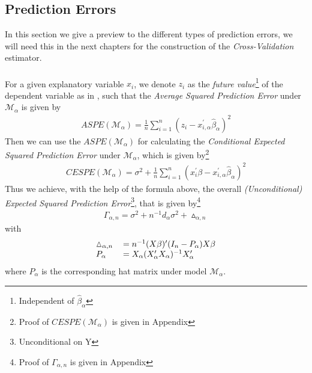 \documentclass[Research_Module_ES.tex]{subfiles}
\begin{document}
\subsection{Prediction Errors}
In this section we give a preview to the different types of prediction errors, we will need this in the next chapters for the construction of the \textit{Cross-Validation} estimator.\\\\
For a given explanatory variable $x_i$, we denote $z_i$ as the \textit{future value}\footnote{Independent of $\hat{\beta}_\alpha$} of the dependent variable as in \cite{shao}, such that the \textit{Average Squared Prediction Error} under $\mathcal{M}_\alpha$ is given by
\begin{align}
ASPE(\mathcal{M}_\alpha)=\frac{1}{n}\sum_{i=1}^{n}(z_i-x_{i,\alpha}^\prime\hat{\beta}_\alpha)^2 \label{ASPE}
\end{align}
Then we can use the $ASPE(\mathcal{M}_\alpha)$ for calculating the \textit{Conditional Expected Squared Prediction Error} under $\mathcal{M}_\alpha$, which is given by\footnote{Proof of $CESPE(\mathcal{M}_\alpha)$ is given in Appendix }
\begin{align*}
CESPE(\mathcal{M}_\alpha)=\sigma^2+\frac{1}{n}\sum_{i=1}^{n}(x_i^\prime\beta-x_{i,\alpha}^\prime\hat{\beta}_\alpha)^2
\end{align*}
Thus we achieve, with the help of the formula above, the overall \textit{(Unconditional) Expected Squared Prediction Error}\footnote{Unconditional on Y}, that is given by\footnote{Proof of $\Gamma_{\alpha,n}$ is given in Appendix } 
\begin{align}
\Gamma_{\alpha,n}=\sigma^2+n^{-1}d_\alpha\sigma^2+\vartriangle_{\alpha,n} 
\end{align}
with
\begin{align*}
\begin{tabular}{ll}
$\vartriangle_{\alpha,n}$&$=n^{-1}(X\beta)^\prime(I_n-P_\alpha)X\beta$\\
$P_\alpha$&$=X_\alpha(X_\alpha^\prime X_\alpha)^{-1}X_\alpha^\prime$
\end{tabular}
\end{align*} 
where $P_\alpha$ is the corresponding hat matrix under model $\mathcal{M}_\alpha$.\\
\end{document}
